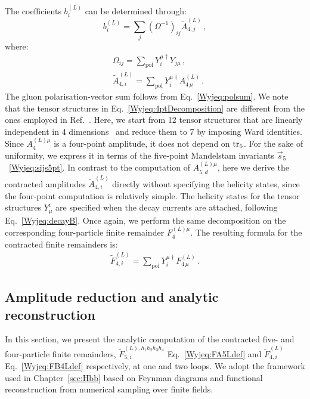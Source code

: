 \documentclass[main.tex]{subfiles}
\begin{document}
The coefficients $b_i^{(L)}$ can be determined through:
\begin{equation}
b^{(L)}_{i} = \sum_{j} \left(\Omega^{-1}\right)_{ij}  \tilde{A}^{(L)}_{4,j} \,,
\label{Wyjeq:solvebi}
\end{equation}
where:
\begin{align}
\label{Wyjeq:Omega}
& \Omega_{ij} = \sum_{\text{pol}} Y^{\mu\dagger}_{i} Y_{j\mu} \,, \\
\label{Wyjeq:B4Ldef}
& \tilde{A}^{(L)}_{4,i} = \sum_{\text{pol}} Y^{\mu\dagger}_{i} A^{(L)}_{4 \, \mu} \,.
\end{align}
The gluon polarisation-vector sum follows from Eq.~\eqref{Wyjeq:polsum}.
We note that the tensor structures in Eq.~\eqref{Wyjeq:4ptDecomposition} are different from the ones employed in Ref.~\cite{Garland:2002ak}.
Here, we start from 12 tensor structures that are linearly independent in 4 dimensions~\cite{Peraro:2019cjj,Peraro:2020sfm} and reduce them to 7 by imposing Ward identities.
Since $A^{(L)\mu}_4$ is a four-point amplitude, it does not depend on $\operatorname{\rm tr}_5$. For the sake of uniformity, we express it in terms of the five-point Mandelstam invariants $\vec{s}_5$~\eqref{Wyjeq:sijs5pt}. 
In contrast to the computation of $A^{(L)\mu}_{5,d}$, here we derive the contracted amplitudes $\tilde{A}^{(L)}_{4,i}$ directly without specifying the helicity states, since the four-point computation
is relatively simple. The helicity states for the tensor structures $Y_\mu^{i}$ are specified when the decay currents are attached, following Eq.~\eqref{Wyjeq:decayB}. Once again, we perform the same decomposition on the corresponding four-particle finite remainder $F^{(L)\mu}_{4}$. The resulting formula for the contracted finite remainders is:
\begin{align} \label{Wyjeq:FB4Ldef}
\tilde{F}^{(L)}_{4,i} = \sum_{\text{pol}} Y^{\mu\dagger}_{i} F^{(L)}_{4 \, \mu} \,.
\end{align}
\subsection{Amplitude reduction and analytic reconstruction}
\label{wyjsec:Reconstruction}
In this section, we present the analytic computation of the contracted five- and four-particle finite remainders, $\tilde{F}_{5,i}^{(L),h_1 h_2 h_3 h_4}$ Eq.~\eqref{Wyjeq:FA5Ldef} and $\tilde{F}_{4,i}^{(L)}$ Eq.~\eqref{Wyjeq:FB4Ldef} respectively, at one and two loops. We adopt the framework used in Chapter~\ref{sec:Hbb} based on Feynman diagrams and functional reconstruction from numerical sampling over finite fields. 
\end{document}
